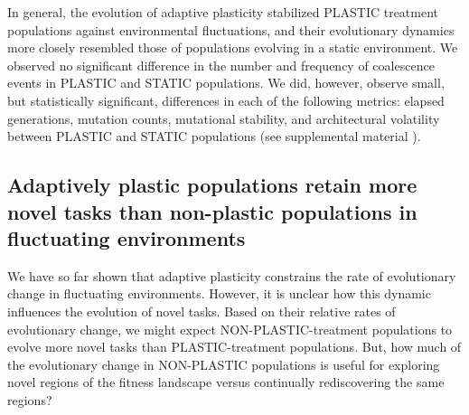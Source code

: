 In general, the evolution of adaptive plasticity stabilized PLASTIC treatment populations against environmental fluctuations, and their evolutionary dynamics more closely resembled those of populations evolving in a static environment.
We observed no significant difference in the number and frequency of coalescence events in PLASTIC and STATIC populations.
We did, however, observe small, but statistically significant, differences in each of the following metrics: elapsed generations, mutation counts, mutational stability, and architectural volatility between PLASTIC and STATIC populations (see supplemental material \citealt{consequences_of_plasticity_supplemental_material_2021}).

\subsection{Adaptively plastic populations retain more novel tasks than non-plastic populations in fluctuating environments}





We have so far shown that adaptive plasticity constrains the rate of evolutionary change in fluctuating environments.
However, it is unclear how this dynamic influences the evolution of novel tasks.
Based on their relative rates of evolutionary change, we might expect NON-PLASTIC-treatment populations to evolve more novel tasks than PLASTIC-treatment populations.
But, how much of the evolutionary change in NON-PLASTIC populations is useful for exploring novel regions of the fitness landscape versus continually rediscovering the same regions?

